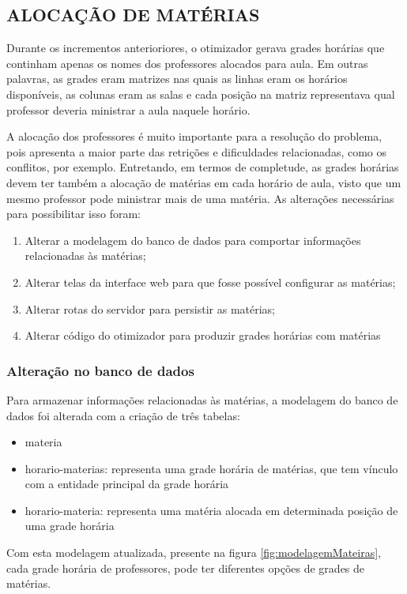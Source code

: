 \subsection{ALOCAÇÃO DE MATÉRIAS}

Durante os incrementos anterioriores, o otimizador gerava grades horárias que continham apenas os nomes dos professores alocados para aula. Em outras palavras, as grades eram matrizes nas quais as linhas eram os horários disponíveis, as colunas eram as salas e cada posição na matriz representava qual professor deveria ministrar a aula naquele horário.

A alocação dos professores é muito importante para a resolução do problema, pois apresenta a maior parte das retrições e dificuldades relacionadas, como os conflitos, por exemplo. Entretando, em termos de completude, as grades horárias devem ter também a alocação de matérias em cada horário de aula, visto que um mesmo professor pode ministrar mais de uma matéria. As alterações necessárias para possibilitar isso foram:

\begin{enumerate}
	\item Alterar a modelagem do banco de dados para comportar informações relacionadas às matérias;
	\item Alterar telas da interface web para que fosse possível configurar as matérias;
	\item Alterar rotas do servidor para persistir as matérias;
	\item Alterar código do otimizador para produzir grades horárias com matérias
\end{enumerate}

\subsubsection{Alteração no banco de dados}
Para armazenar informações relacionadas às matérias, a modelagem do banco de dados foi alterada com a criação de três tabelas: 
\begin{itemize}
	\item materia
	\item horario-materias: representa uma grade horária de matérias, que tem vínculo com a entidade principal da grade horária
	\item horario-materia: representa uma matéria alocada em determinada posição de uma grade horária
\end{itemize}

Com esta modelagem atualizada, presente na figura \ref{fig:modelagemMateiras}, cada grade horária de professores, pode ter diferentes opções de grades de matérias.

